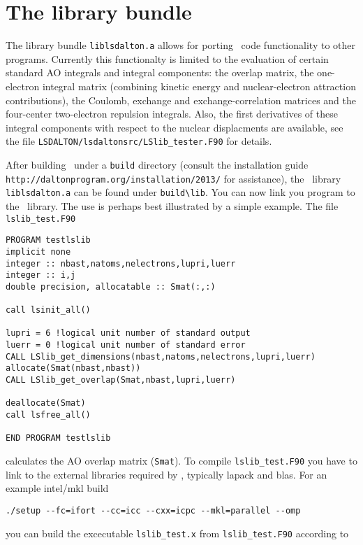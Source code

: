 \section{The {\lsdalton} library bundle}
\label{sec:LSlib}

The {\lsdalton} library bundle \verb|liblsdalton.a| allows for porting \lsdalton\ code 
functionality to other programs. Currently this functionalty is limited to 
the evaluation of certain standard AO integrals and integral components: the overlap 
matrix, the one-electron integral matrix (combining kinetic energy and 
nuclear-electron attraction contributions), the Coulomb, exchange and exchange-correlation 
matrices and the four-center two-electron repulsion integrals. Also, the 
first derivatives of these integral components with respect to the nuclear displacments 
are available, see the file \verb|LSDALTON/lsdaltonsrc/LSlib_tester.F90|
for details. 

After building \lsdalton\ under a \verb|build| directory (consult the installation guide
\verb|http://daltonprogram.org/installation/2013/| for assistance), the \lsdalton\ library 
\verb|liblsdalton.a| can be found under \verb|build\lib|. You can now link you 
program to the \lsdalton\ library. 
The use is perhaps best illustrated by a simple example. The file \verb|lslib_test.F90|

\begin{verbatim}
PROGRAM testlslib
implicit none
integer :: nbast,natoms,nelectrons,lupri,luerr
integer :: i,j
double precision, allocatable :: Smat(:,:)

call lsinit_all()

lupri = 6 !logical unit number of standard output
luerr = 0 !logical unit number of standard error
CALL LSlib_get_dimensions(nbast,natoms,nelectrons,lupri,luerr)
allocate(Smat(nbast,nbast))
CALL LSlib_get_overlap(Smat,nbast,lupri,luerr)

deallocate(Smat)
call lsfree_all()

END PROGRAM testlslib
\end{verbatim}
%
calculates the AO overlap matrix (\verb|Smat|). To compile \verb|lslib_test.F90|
you have to link to the external libraries required by \lsdalton, typically lapack
and blas. For an example intel/mkl build

\begin{verbatim}
./setup --fc=ifort --cc=icc --cxx=icpc --mkl=parallel --omp
\end{verbatim}
%
you can build the excecutable \verb|lslib_test.x| from \verb|lslib_test.F90| according to

